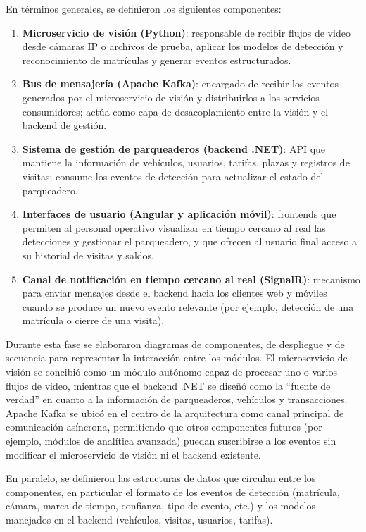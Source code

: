 En términos generales, se definieron los siguientes componentes:

\begin{enumerate}
    \item \textbf{Microservicio de visión (Python)}: responsable de recibir flujos de video desde cámaras IP o archivos de prueba, aplicar los modelos de detección y reconocimiento de matrículas y generar eventos estructurados.
    \item \textbf{Bus de mensajería (Apache Kafka)}: encargado de recibir los eventos generados por el microservicio de visión y distribuirlos a los servicios consumidores; actúa como capa de desacoplamiento entre la visión y el backend de gestión.
    \item \textbf{Sistema de gestión de parqueaderos (backend .NET)}: API que mantiene la información de vehículos, usuarios, tarifas, plazas y registros de visitas; consume los eventos de detección para actualizar el estado del parqueadero.
    \item \textbf{Interfaces de usuario (Angular y aplicación móvil)}: frontends que permiten al personal operativo visualizar en tiempo cercano al real las detecciones y gestionar el parqueadero, y que ofrecen al usuario final acceso a su historial de visitas y saldos.
    \item \textbf{Canal de notificación en tiempo cercano al real (SignalR)}: mecanismo para enviar mensajes desde el backend hacia los clientes web y móviles cuando se produce un nuevo evento relevante (por ejemplo, detección de una matrícula o cierre de una visita).
\end{enumerate}

Durante esta fase se elaboraron diagramas de componentes, de despliegue y de secuencia para representar la interacción entre los módulos. El microservicio de visión se concibió como un módulo autónomo capaz de procesar uno o varios flujos de video, mientras que el backend .NET se diseñó como la “fuente de verdad” en cuanto a la información de parqueaderos, vehículos y transacciones. Apache Kafka se ubicó en el centro de la arquitectura como canal principal de comunicación asíncrona, permitiendo que otros componentes futuros (por ejemplo, módulos de analítica avanzada) puedan suscribirse a los eventos sin modificar el microservicio de visión ni el backend existente.

En paralelo, se definieron las estructuras de datos que circulan entre los componentes, en particular el formato de los eventos de detección (matrícula, cámara, marca de tiempo, confianza, tipo de evento, etc.) y los modelos manejados en el backend (vehículos, visitas, usuarios, tarifas).

